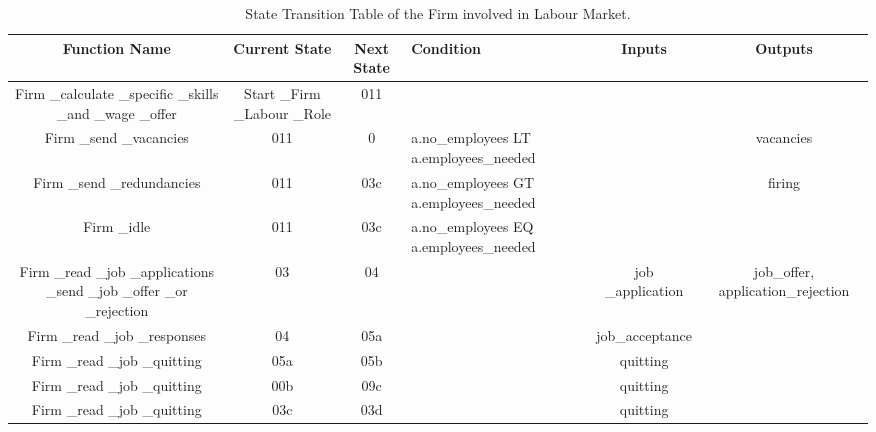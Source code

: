 \begin{landscape}
\begin{table}[!htb]\caption{State Transition Table of the Firm involved in Labour Market.}
\begin{center}
\begin{tabular}{|c|c|c|l|c|c|}
\hline
Function Name & Current State & Next State & Condition & Inputs & Outputs \\
\hline {\parbox[l]{5cm}{Firm \_calculate \_specific \_skills \_and
\_wage \_offer}}& {\parbox[l]{4cm}{Start \_Firm \_Labour \_Role}}&
{\parbox[l]{3cm}{011}}& & & \\
\hline

{\parbox[l]{5cm}{Firm \_send \_vacancies}}& {\parbox[l]{3cm}{011}}&
{\parbox[l]{3cm}{0}}& {\parbox[l]{4cm}{a.no\_employees LT
a.employees\_needed}}& & {\parbox[l]{3cm}{vacancies}}\\
\hline

{\parbox[l]{5cm}{Firm \_send \_redundancies}}&
{\parbox[l]{3cm}{011}}& {\parbox[l]{3cm}{03c}}&
{\parbox[l]{4cm}{a.no\_employees GT a.employees\_needed}} &
 &{\parbox[l]{3cm}{firing}}
\\
\hline

{\parbox[l]{5cm}{Firm \_idle}}& {\parbox[l]{3cm}{011}}&
{\parbox[l]{3cm}{03c}}&{\parbox[l]{4cm}{a.no\_employees EQ
a.employees\_needed}}
 & &
\\
\hline

{\parbox[l]{5cm}{Firm \_read \_job \_applications \_send \_job
\_offer \_or \_rejection}}& {\parbox[l]{3cm}{03}}&
{\parbox[l]{3cm}{04}}& &{\parbox[l]{3cm}{job \_application}}&
{\parbox[l]{3cm}{job\_offer, application\_rejection}}
\\
\hline


{\parbox[l]{5cm}{Firm \_read \_job \_responses}}&
{\parbox[l]{3cm}{04}}& {\parbox[l]{3cm}{05a}}& &
{\parbox[l]{3cm}{job\_acceptance}}&
\\



\hline {\parbox[l]{5cm}{Firm \_read \_job \_quitting}}&
{\parbox[l]{3cm}{05a}}& {\parbox[l]{3cm}{05b}}&&
{\parbox[l]{3cm}{quitting}}
 &
\\
\hline {\parbox[l]{5cm}{Firm \_read \_job \_quitting}}&
{\parbox[l]{3cm}{00b}}& {\parbox[l]{3cm}{09c}}& &
{\parbox[l]{3cm}{quitting}} &
\\
\hline  {\parbox[l]{5cm}{Firm \_read \_job \_quitting}}&
{\parbox[l]{3cm}{03c}}& {\parbox[l]{3cm}{03d}}& &
{\parbox[l]{3cm}{quitting}} & \\
\hline




\end{tabular}
\end{center}
\end{table}
\end{landscape}
